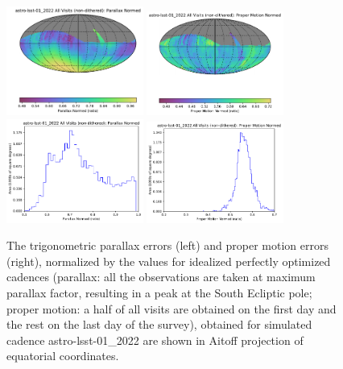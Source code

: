 \documentclass[DM,lsstdraft,authoryear,toc]{lsstdoc}
\begin{document}
\begin{figure}[t!]
\centering
\includegraphics[width=0.4\textwidth]{figures/astro-lsst-01_2022_Parallax_Normed_All_Visits_non-dithered_HEAL_SkyMap.pdf}
\includegraphics[width=0.4\textwidth]{figures/astro-lsst-01_2022_Proper_Motion_Normed_All_Visits_non-dithered_HEAL_SkyMap.pdf} \\
\includegraphics[width=0.4\textwidth]{figures/astro-lsst-01_2022_Parallax_Normed_All_Visits_non-dithered_HEAL_Histogram.pdf}
\includegraphics[width=0.4\textwidth]{figures/astro-lsst-01_2022_Proper_Motion_Normed_All_Visits_non-dithered_HEAL_Histogram.pdf}
\caption{The trigonometric parallax errors (left) and proper motion errors (right), normalized
by the values for idealized perfectly optimized cadences (parallax: all the observations are taken
at maximum parallax factor, resulting in a peak at the South Ecliptic pole; proper motion:
a half of all visits are obtained on the first day and the rest on the last day of the survey),
obtained for simulated cadence astro-lsst-01\_2022 are shown in Aitoff projection of equatorial
coordinates.}
\label{fig:baseline_parapm}
\end{figure}
\end{document}
